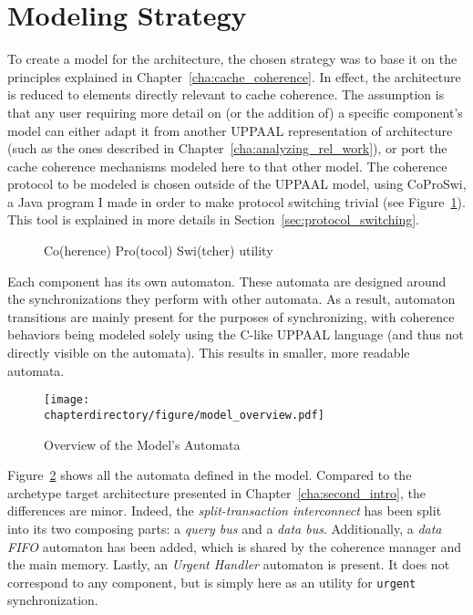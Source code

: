 \section{Modeling Strategy}
\label{sec:modeling:strategy}
To create a model for the architecture, the chosen strategy was to base it on
the principles explained in Chapter~\ref{cha:cache_coherence}. In effect, the
architecture is reduced to elements directly relevant to cache coherence. The
assumption is that any user requiring more detail on (or the addition of) a
specific component's model can either adapt it from another UPPAAL
representation of architecture (such as the ones described in
Chapter~\ref{cha:analyzing_rel_work}), or port the cache coherence mechanisms
modeled here to that other model. The coherence protocol to be modeled is
chosen outside of the UPPAAL model, using CoProSwi, a Java program I made in
order to make protocol switching trivial (see
Figure~\ref{fig:second_intro:coproswi}). This tool is explained in more details
in Section~\ref{sec:protocol_switching}.

\begin{figure}[hbt!]
\begin{center}

\end{center}
\caption{Co(herence) Pro(tocol) Swi(tcher) utility}
\label{fig:second_intro:coproswi}
\end{figure}

Each component has its own automaton. These automata are designed around the
synchronizations they perform with other automata. As a result, automaton
transitions are mainly present for the purposes of synchronizing, with coherence
behaviors being modeled solely using the C-like UPPAAL language (and thus not
directly visible on the automata). This results in smaller, more readable
automata.

\begin{figure}[hbt!]
\begin{center}
\texttt{[image: \\chapterdirectory/figure/model\_overview.pdf]}
\end{center}
\caption{Overview of the Model's Automata}
\label{fig:UPPAAL:automata_overview}
\end{figure}

Figure~\ref{fig:UPPAAL:automata_overview} shows all the automata defined in the
model. Compared to the archetype target architecture presented in
Chapter~\ref{cha:second_intro}, the differences are minor. Indeed, the
\textit{split-transaction interconnect} has been split into its two composing
parts: a \textit{query bus} and a \textit{data bus}. Additionally, a
\textit{data FIFO} automaton has been added, which is shared by the coherence
manager and the main memory. Lastly, an \textit{Urgent Handler} automaton is
present. It does not correspond to any component, but is simply here as an
utility for \texttt{urgent} synchronization.

